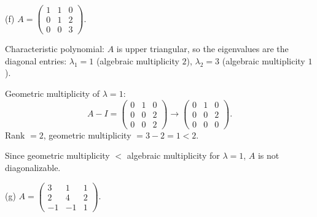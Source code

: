 \documentclass{article}
\begin{document}
\bigskip

\noindent\textnormal{(f)}
$A = \begin{pmatrix} 1 & 1 & 0 \\ 0 & 1 & 2 \\ 0 & 0 & 3 \end{pmatrix}$.

\begin{mdframed}[linewidth=1pt]
\textnormal{Characteristic polynomial:}
$A$ is upper triangular, so the eigenvalues are the diagonal entries: $\lambda_1 = 1$ (algebraic multiplicity $2$), $\lambda_2 = 3$ (algebraic multiplicity $1$).

\textnormal{Geometric multiplicity of $\lambda = 1$:}
\[
A - I = \begin{pmatrix} 0 & 1 & 0 \\ 0 & 0 & 2 \\ 0 & 0 & 2 \end{pmatrix} \to \begin{pmatrix} 0 & 1 & 0 \\ 0 & 0 & 2 \\ 0 & 0 & 0 \end{pmatrix}.
\]
Rank $= 2$, geometric multiplicity $= 3 - 2 = 1 < 2$.

Since geometric multiplicity $<$ algebraic multiplicity for $\lambda = 1$, $A$ is \textnormal{not diagonalizable}.
\end{mdframed}

\bigskip

\noindent\textnormal{(g)}
$A = \begin{pmatrix} 3 & 1 & 1 \\ 2 & 4 & 2 \\ -1 & -1 & 1 \end{pmatrix}$.
\end{document}
